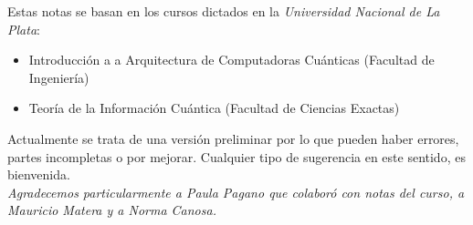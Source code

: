 \begin{center}
  \textsc{}
\end{center}
%
\noindent
%

Estas notas se basan en los cursos dictados en la {\it Universidad Nacional de La Plata}:

\begin{itemize}
  \item Introducción a a Arquitectura de Computadoras Cuánticas (Facultad de Ingeniería)
  \item Teoría de la Información Cuántica (Facultad de Ciencias Exactas)
\end{itemize}

Actualmente se trata de una versión preliminar por lo que pueden haber errores, partes incompletas o por mejorar. 
Cualquier tipo de sugerencia en este sentido, es bienvenida. \\


 {\it Agradecemos particularmente a Paula Pagano que colaboró con notas del curso, a Mauricio Matera y a Norma Canosa. }